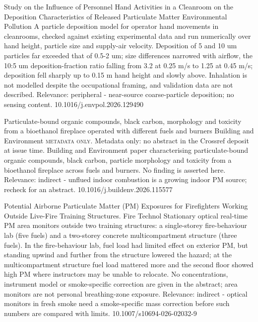 \documentclass[10pt]{article}
\begin{document}
{Study on the Influence of Personnel Hand Activities in a Cleanroom on the Deposition Characteristics of Released Particulate Matter}
{Environmental Pollution}
{A particle deposition model for operator hand movements in cleanrooms, checked against existing experimental data and run numerically over hand height, particle size and supply-air velocity. Deposition of 5 and 10 um particles far exceeded that of 0.5-2 um; size differences narrowed with airflow, the 10:5 um deposition-fraction ratio falling from 3.2 at 0.25 m/s to 1.25 at 0.45 m/s; deposition fell sharply up to 0.15 m hand height and slowly above. Inhalation is not modelled despite the occupational framing, and validation data are not described. Relevance: peripheral - near-source coarse-particle deposition; no sensing content.}
{10.1016/j.envpol.2026.129490}

{Particulate-bound organic compounds, black carbon, morphology and toxicity from a bioethanol fireplace operated with different fuels and burners}
{Building and Environment}
{\textsc{metadata only.} Metadata only: no abstract in the Crossref deposit at issue time. Building and Environment paper characterising particulate-bound organic compounds, black carbon, particle morphology and toxicity from a bioethanol fireplace across fuels and burners. No finding is asserted here. Relevance: indirect - unflued indoor combustion is a growing indoor PM source; recheck for an abstract.}
{10.1016/j.buildenv.2026.115577}

{Potential Airborne Particulate Matter (PM) Exposures for Firefighters Working Outside Live-Fire Training Structures.}
{Fire Technol}
{Stationary optical real-time PM area monitors outside two training structures: a single-storey fire-behaviour lab (five fuels) and a two-storey concrete multicompartment structure (three fuels). In the fire-behaviour lab, fuel load had limited effect on exterior PM, but standing upwind and further from the structure lowered the hazard; at the multicompartment structure fuel load mattered more and the second floor showed high PM where instructors may be unable to relocate. No concentrations, instrument model or smoke-specific correction are given in the abstract; area monitors are not personal breathing-zone exposure. Relevance: indirect - optical monitors in fresh smoke need a smoke-specific mass correction before such numbers are compared with limits.}
{10.1007/s10694-026-02032-9}
\end{document}
